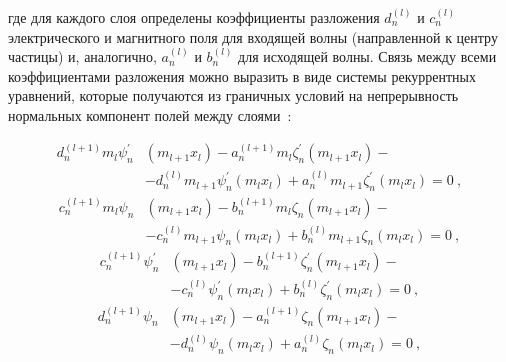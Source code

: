 где для каждого слоя определены коэффициенты разложения $d_n^{(l)}$ и
$c_n^{(l)}$ электрического и магнитного поля для входящей волны
(направленной к центру частицы) и, аналогично, $a_n^{(l)}$ и
$b_n^{(l)}$ для исходящей волны.  Связь между всеми коэффициентами
разложения можно выразить в виде системы рекуррентных уравнений,
которые получаются из граничных условий на непрерывность
нормальных компонент полей между слоями~\cite{Yang-2003}:

\begin{equation} %
  \label{eq:A2d1}
    \begin{alignedat}{2}
d^{(l+1)}_{n}m_{l} \psi^{\prime}_{n}&{\left (m_{l+1} x_{l} \right )}
- a^{(l+1)}_{n} m_{l} \zeta^{\prime}_{n}{\left (m_{l+1} x_{l} \right )}-\\
& - d^{(l)}_{n} m_{l+1} \psi^{\prime}_{n}{\left (m_{l} x_{l} \right )} 
+ a^{(l)}_{n} m_{l+1} \zeta^{\prime}_{n}{\left (m_{l} x_{l} \right )}
= 0\:,
\end{alignedat}
\end{equation}
\begin{equation} %
  \label{eq:A2d2}
\begin{alignedat}{2}
c^{(l+1)}_{n} m_{l} \psi_{n}&{\left (m_{l+1} x_{l} \right )}
  - b^{(l+1)}_{n} m_{l} \zeta_{n}{\left (m_{l+1} x_{l} \right )}-\\
&- c^{(l)}_{n} m_{l+1} \psi_{n}{\left (m_{l} x_{l} \right )} 
+b^{(l)}_{n} m_{l+1} \zeta_{n}{\left (m_{l} x_{l} \right )}  =0\:,
\end{alignedat}
\end{equation}
\begin{equation} %
  \label{eq:A2d3}
\begin{alignedat}{2}
c^{(l+1)}_{n} \psi^{\prime}_{n}&{\left (m_{l+1} x_{l} \right )}
- b^{(l+1)}_{n} \zeta^{\prime}_{n}{\left (m_{l+1} x_{l} \right )}-\\
&- c^{(l)}_{n} \psi^{\prime}_{n}{\left (m_{l} x_{l} \right )} 
+b^{(l)}_{n} \zeta^{\prime}_{n}{\left (m_{l} x_{l} \right )}   =0\:,
\end{alignedat}
\end{equation}
\begin{equation} %
  \label{eq:A2d4}
\begin{alignedat}{2}
 d^{(l+1)}_{n} \psi_{n}&{\left (m_{l+1} x_{l} \right )}
- a^{(l+1)}_{n} \zeta_{n}{\left (m_{l+1} x_{l} \right )}-\\
& - d^{(l)}_{n} \psi_{n}{\left (m_{l} x_{l} \right )} 
+ a^{(l)}_{n} \zeta_{n}{\left (m_{l} x_{l} \right )}   =0\:,
\end{alignedat}
\end{equation}
